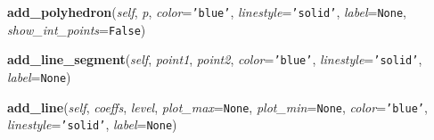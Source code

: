     \vspace{0.5ex}

\hspace{.8\funcindent}\begin{boxedminipage}{\funcwidth}

    \raggedright \textbf{add\_polyhedron}(\textit{self}, \textit{p}, \textit{color}={\tt \texttt{'}\texttt{blue}\texttt{'}}, \textit{linestyle}={\tt \texttt{'}\texttt{solid}\texttt{'}}, \textit{label}={\tt None}, \textit{show\_int\_points}={\tt False})

\setlength{\parskip}{2ex}
\setlength{\parskip}{1ex}
    \end{boxedminipage}

    \label{coinor:grumpy:polyhedron2D:Figure:add_line_segment}

    \vspace{0.5ex}

\hspace{.8\funcindent}\begin{boxedminipage}{\funcwidth}

    \raggedright \textbf{add\_line\_segment}(\textit{self}, \textit{point1}, \textit{point2}, \textit{color}={\tt \texttt{'}\texttt{blue}\texttt{'}}, \textit{linestyle}={\tt \texttt{'}\texttt{solid}\texttt{'}}, \textit{label}={\tt None})

\setlength{\parskip}{2ex}
\setlength{\parskip}{1ex}
    \end{boxedminipage}

    \label{coinor:grumpy:polyhedron2D:Figure:add_line}

    \vspace{0.5ex}

\hspace{.8\funcindent}\begin{boxedminipage}{\funcwidth}

    \raggedright \textbf{add\_line}(\textit{self}, \textit{coeffs}, \textit{level}, \textit{plot\_max}={\tt None}, \textit{plot\_min}={\tt None}, \textit{color}={\tt \texttt{'}\texttt{blue}\texttt{'}}, \textit{linestyle}={\tt \texttt{'}\texttt{solid}\texttt{'}}, \textit{label}={\tt None})

\setlength{\parskip}{2ex}
\setlength{\parskip}{1ex}
    \end{boxedminipage}

